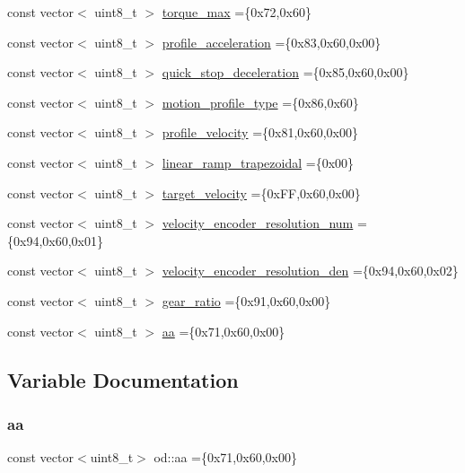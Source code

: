 \begin{DoxyCompactItemize}
\item 
const vector$<$ uint8\+\_\+t $>$ \hyperlink{namespaceod_afe81091f209f3c5eaf8f720e730900fa}{torque\+\_\+max} =\{0x72,0x60\}
\item 
const vector$<$ uint8\+\_\+t $>$ \hyperlink{namespaceod_aced8c17d62c0e774949057de0a99f402}{profile\+\_\+acceleration} =\{0x83,0x60,0x00\}
\item 
const vector$<$ uint8\+\_\+t $>$ \hyperlink{namespaceod_a57361a1a6b60fd8b93c2828fd7f5429f}{quick\+\_\+stop\+\_\+deceleration} =\{0x85,0x60,0x00\}
\item 
const vector$<$ uint8\+\_\+t $>$ \hyperlink{namespaceod_a5256e8439c66da9ab7ad06fa5f72ec1a}{motion\+\_\+profile\+\_\+type} =\{0x86,0x60\}
\item 
const vector$<$ uint8\+\_\+t $>$ \hyperlink{namespaceod_a47b7c8f6797cc134be5ee1d78d83ee50}{profile\+\_\+velocity} =\{0x81,0x60,0x00\}
\item 
const vector$<$ uint8\+\_\+t $>$ \hyperlink{namespaceod_a8d1e6a3e8180e5d64d68588ee182721c}{linear\+\_\+ramp\+\_\+trapezoidal} =\{0x00\}
\item 
const vector$<$ uint8\+\_\+t $>$ \hyperlink{namespaceod_a758ce0003cc482e5464959ed79c808e2}{target\+\_\+velocity} =\{0x\+F\+F,0x60,0x00\}
\item 
const vector$<$ uint8\+\_\+t $>$ \hyperlink{namespaceod_ace9cc22d0ccd7e2ac1b14fb14151ed73}{velocity\+\_\+encoder\+\_\+resolution\+\_\+num} =\{0x94,0x60,0x01\}
\item 
const vector$<$ uint8\+\_\+t $>$ \hyperlink{namespaceod_a2b157384b9a0fb00e80e99438f24f5de}{velocity\+\_\+encoder\+\_\+resolution\+\_\+den} =\{0x94,0x60,0x02\}
\item 
const vector$<$ uint8\+\_\+t $>$ \hyperlink{namespaceod_af615192e30bab04a02f1aa4c21a48642}{gear\+\_\+ratio} =\{0x91,0x60,0x00\}
\item 
const vector$<$ uint8\+\_\+t $>$ \hyperlink{namespaceod_a58009f80110aa4aff7a7ccd58037c27b}{aa} =\{0x71,0x60,0x00\}
\end{DoxyCompactItemize}


\subsection{Variable Documentation}
\mbox{\label{namespaceod_a58009f80110aa4aff7a7ccd58037c27b}} 
\subsubsection{\texorpdfstring{aa}{aa}}
{\footnotesize\ttfamily const vector$<$uint8\+\_\+t$>$ od\+::aa =\{0x71,0x60,0x00\}}

